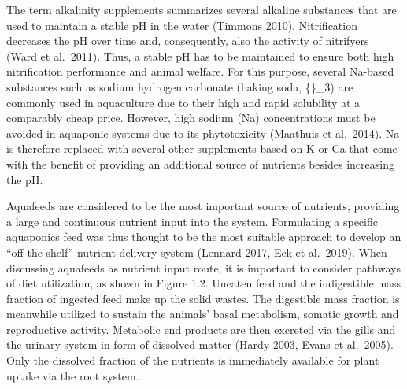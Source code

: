 \documentclass[preprint, 3p,
authoryear]{elsarticle} %
\begin{document}
The term alkalinity supplements summarizes several alkaline substances
that are used to maintain a stable pH in the water (Timmons 2010).
Nitrification decreases the pH over time and, consequently, also the
activity of nitrifyers (Ward et al.~2011). Thus, a stable pH has to be
maintained to ensure both high nitrification performance and animal
welfare. For this purpose, several Na-based substances such as sodium
hydrogen carbonate (baking soda, \{\}\_3) are commonly
used in aquaculture due to their high and rapid solubility at a
comparably cheap price. However, high sodium (Na) concentrations must be
avoided in aquaponic systems due to its phytotoxicity (Maathuis et
al.~2014). Na is therefore replaced with several other supplements based
on K or Ca that come with the benefit of providing an additional source
of nutrients besides increasing the pH.

Aquafeeds are considered to be the most important source of nutrients,
providing a large and continuous nutrient input into the system.
Formulating a specific aquaponics feed was thus thought to be the most
suitable approach to develop an ``off-the-shelf'' nutrient delivery
system (Lennard 2017, Eck et al.~2019). When discussing aquafeeds as
nutrient input route, it is important to consider pathways of diet
utilization, as shown in Figure 1.2. Uneaten feed and the indigestible
mass fraction of ingested feed make up the solid wastes. The digestible
mass fraction is meanwhile utilized to sustain the animals' basal
metabolism, somatic growth and reproductive activity. Metabolic end
products are then excreted via the gills and the urinary system in form
of dissolved matter (Hardy 2003, Evans et al.~2005). Only the dissolved
fraction of the nutrients is immediately available for plant uptake via
the root system.
\end{document}
